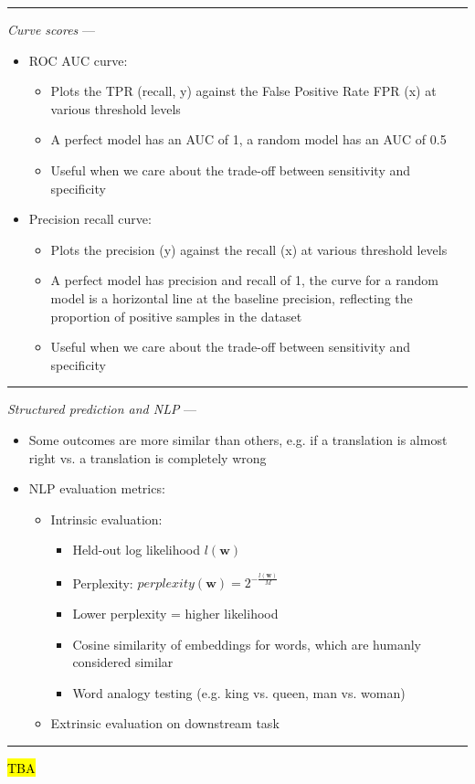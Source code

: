 {\color{lightgray}\hrule height 0.001mm}

\emph{Curve scores} --- 
\begin{itemize}
    \item ROC AUC curve: 
    \begin{itemize}
        \item Plots the TPR (recall, y) against the False Positive Rate FPR (x) at various threshold levels
        \item A perfect model has an AUC of 1, a random model has an AUC of 0.5
        \item Useful when we care about the trade-off between sensitivity and specificity
    \end{itemize}
    \item Precision recall curve:
    \begin{itemize}
        \item Plots the precision (y) against the recall (x) at various threshold levels
        \item A perfect model has precision and recall of 1, the curve for a random model is a horizontal line at the baseline precision, reflecting the proportion of positive samples in the dataset
        \item Useful when we care about the trade-off between sensitivity and specificity
    \end{itemize}
\end{itemize}

{\color{lightgray}\hrule height 0.001mm}

\emph{Structured prediction and NLP} --- 
\begin{itemize}
    \item Some outcomes are more similar than others, e.g. if a translation is almost right vs. a translation is completely wrong
    \item NLP evaluation metrics:
    \begin{itemize}
        \item Intrinsic evaluation:
        \begin{itemize}
            \item Held-out log likelihood $l(\boldsymbol{w})$
            \item Perplexity: $perplexity(\boldsymbol{w}) = 2^{-\frac{l(\boldsymbol{w})}{M}}$
            \item Lower perplexity = higher likelihood
            \item Cosine similarity of embeddings for words, which are humanly considered similar
            \item Word analogy testing (e.g. king vs. queen, man vs. woman)
        \end{itemize}
        \item Extrinsic evaluation on downstream task
    \end{itemize}
\end{itemize}

{\color{lightgray}\hrule height 0.001mm}

\hl{TBA}